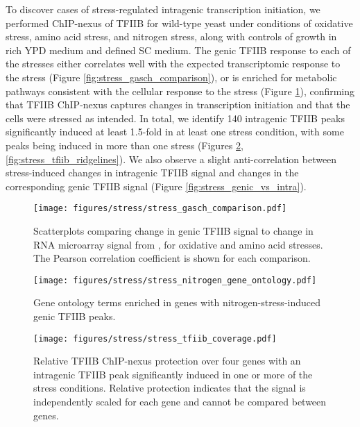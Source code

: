 To discover cases of stress-regulated intragenic transcription initiation, we performed ChIP-nexus of TFIIB for wild-type yeast under conditions of oxidative stress, amino acid stress, and nitrogen stress, along with controls of growth in rich YPD medium and defined SC medium.
The genic TFIIB response to each of the stresses either correlates well with the expected transcriptomic response to the stress (Figure \ref{fig:stress_gasch_comparison}), or is enriched for metabolic pathways consistent with the cellular response to the stress (Figure \ref{fig:stress_nitrogen_gene_ontology}), confirming that TFIIB ChIP-nexus captures changes in transcription initiation and that the cells were stressed as intended.
In total, we identify 140 intragenic TFIIB peaks significantly induced at least 1.5-fold in at least one stress condition, with some peaks being induced in more than one stress (Figures \ref{fig:stress_tfiib_coverage}, \ref{fig:stress_tfiib_ridgelines}).
We also observe a slight anti-correlation between stress-induced changes in intragenic TFIIB signal and changes in the corresponding genic TFIIB signal (Figure \ref{fig:stress_genic_vs_intra}).
\begin{figure}[h]
    \centering
    \texttt{[image: figures/stress/stress\_gasch\_comparison.pdf]}
    \caption[Scatterplots comparing change in genic TFIIB signal to change in RNA microarray signal, for oxidative and amino acid stresses.]{Scatterplots comparing change in genic TFIIB signal to change in RNA microarray signal from \citet{gasch2000}, for oxidative and amino acid stresses. The Pearson correlation coefficient is shown for each comparison.}
    \label{fig:stress_gasch_comparison}
    \vspace{1em}

    \texttt{[image: figures/stress/stress\_nitrogen\_gene\_ontology.pdf]}
    \caption[Gene ontology terms enriched in genes with nitrogen-stress-induced genic TFIIB peaks]{Gene ontology terms enriched in genes with nitrogen-stress-induced genic TFIIB peaks.}
    \label{fig:stress_nitrogen_gene_ontology}
\end{figure}

\clearpage

\begin{figure}[h]
    \texttt{[image: figures/stress/stress\_tfiib\_coverage.pdf]}
    \caption[TFIIB ChIP-nexus protection over four genes with stress-induced intragenic TFIIB peaks.]{Relative TFIIB ChIP-nexus protection over four genes with an intragenic TFIIB peak significantly induced in one or more of the stress conditions. Relative protection indicates that the signal is independently scaled for each gene and cannot be compared between genes.}
    \label{fig:stress_tfiib_coverage}
\end{figure}

